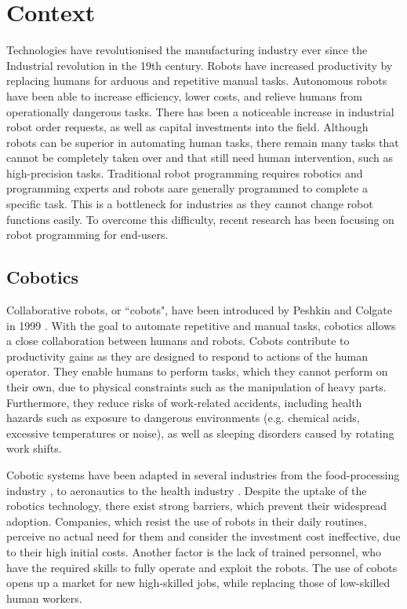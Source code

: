 \section{Context}
Technologies have revolutionised the manufacturing industry ever since the Industrial revolution in the 19th century.
Robots have increased productivity by replacing humans for arduous and repetitive manual tasks.
Autonomous robots have been able to increase efficiency, lower costs, and relieve humans from operationally dangerous tasks.
There has been a noticeable increase in industrial robot order requests, as well as capital investments into the field.
Although robots can be superior in automating human tasks, there remain many tasks that cannot be completely taken over and that still need human intervention, such as high-precision tasks.
Traditional robot programming requires robotics and programming experts and robots aare generally programmed to complete a specific task.
This is a bottleneck for industries as they cannot change robot functions easily.
To overcome this difficulty, recent research has been focusing on robot programming for end-users.


\subsection{Cobotics}\label{subsec:Cobotics}
Collaborative robots, or ``cobots", have been introduced by Peshkin and Colgate in 1999 \cite{colgate1999cobots}.
With the goal to automate repetitive and manual tasks, cobotics allows a close collaboration between humans and robots.
Cobots contribute to productivity gains as they are designed to respond to actions of the human operator.
They enable humans to perform tasks, which they cannot perform on their own, due to physical constraints such as the manipulation of heavy parts.
Furthermore, they reduce risks of work-related accidents, including health hazards such as exposure to dangerous environments (e.g. chemical acids, excessive temperatures or noise), as well as sleeping disorders caused by rotating work shifts.

Cobotic systems have been adapted in several industries from the food-processing industry \cite{Food}, to aeronautics \cite{Airbus} to the health industry \cite{Ebola}.
Despite the uptake of the robotics technology, there exist strong barriers, which prevent their widespread adoption.
Companies, which resist the use of robots in their daily routines, perceive no actual need for them and consider the investment cost ineffective, due to their high initial costs.
Another factor is the lack of trained personnel, who have the required skills to fully operate and exploit the robots.
The use of cobots opens up a market for new high-skilled jobs, while replacing those of low-skilled human workers.

